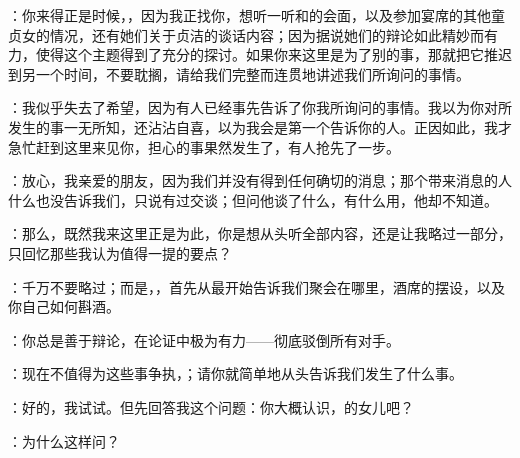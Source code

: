 ：你来得正是时候，，因为我正找你，想听一听和的会面，以及参加宴席的其他童贞女的情况，还有她们关于贞洁的谈话内容；因为据说她们的辩论如此精妙而有力，使得这个主题得到了充分的探讨。如果你来这里是为了别的事，那就把它推迟到另一个时间，不要耽搁，请给我们完整而连贯地讲述我们所询问的事情。\par

：我似乎失去了希望，因为有人已经事先告诉了你我所询问的事情。我以为你对所发生的事一无所知，还沾沾自喜，以为我会是第一个告诉你的人。正因如此，我才急忙赶到这里来见你，担心的事果然发生了，有人抢先了一步。\par

：放心，我亲爱的朋友，因为我们并没有得到任何确切的消息；那个带来消息的人什么也没告诉我们，只说有过交谈；但问他谈了什么，有什么用，他却不知道。\par

：那么，既然我来这里正是为此，你是想从头听全部内容，还是让我略过一部分，只回忆那些我认为值得一提的要点？\par

：千万不要略过；而是，，首先从最开始告诉我们聚会在哪里，酒席的摆设，以及你自己如何斟酒。\par

：你总是善于辩论，在论证中极为有力——彻底驳倒所有对手。\par

：现在不值得为这些事争执，；请你就简单地从头告诉我们发生了什么事。\par

：好的，我试试。但先回答我这个问题：你大概认识，的女儿吧？\par

：为什么这样问？\par

